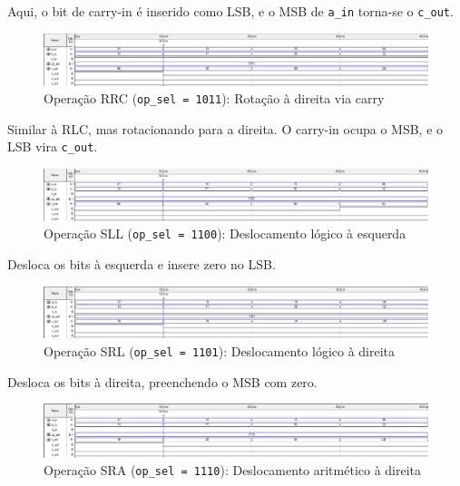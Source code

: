 Aqui, o bit de carry-in é inserido como LSB, e o MSB de \texttt{a\_in} torna-se o \texttt{c\_out}.

\begin{figure}[H]
\centering
\includegraphics[width=\textwidth]{images/alu_1011.png}
\caption{Operação RRC (\texttt{op\_sel = 1011}): Rotação à direita via carry}
\end{figure}

Similar à RLC, mas rotacionando para a direita. O carry-in ocupa o MSB, e o LSB vira \texttt{c\_out}.

\begin{figure}[H]
\centering
\includegraphics[width=\textwidth]{images/alu_1100.png}
\caption{Operação SLL (\texttt{op\_sel = 1100}): Deslocamento lógico à esquerda}
\end{figure}

Desloca os bits à esquerda e insere zero no LSB.

\begin{figure}[H]
\centering
\includegraphics[width=\textwidth]{images/alu_1101.png}
\caption{Operação SRL (\texttt{op\_sel = 1101}): Deslocamento lógico à direita}
\end{figure}

Desloca os bits à direita, preenchendo o MSB com zero.

\begin{figure}[H]
\centering
\includegraphics[width=\textwidth]{images/alu_1110.png}
\caption{Operação SRA (\texttt{op\_sel = 1110}): Deslocamento aritmético à direita}
\end{figure}

